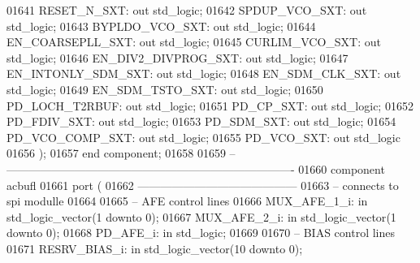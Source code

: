 \begin{DoxyCode}
01641         RESET\_N\_SXT:    \textcolor{keywordflow}{out} \textcolor{comment}{std\_logic};
01642         SPDUP\_VCO\_SXT:  \textcolor{keywordflow}{out} \textcolor{comment}{std\_logic};
01643         BYPLDO\_VCO\_SXT: \textcolor{keywordflow}{out} \textcolor{comment}{std\_logic};
01644         EN\_COARSEPLL\_SXT:   \textcolor{keywordflow}{out} \textcolor{comment}{std\_logic};
01645         CURLIM\_VCO\_SXT: \textcolor{keywordflow}{out} \textcolor{comment}{std\_logic};
01646         EN\_DIV2\_DIVPROG\_SXT:    \textcolor{keywordflow}{out} \textcolor{comment}{std\_logic};
01647         EN\_INTONLY\_SDM\_SXT: \textcolor{keywordflow}{out} \textcolor{comment}{std\_logic};
01648         EN\_SDM\_CLK\_SXT: \textcolor{keywordflow}{out} \textcolor{comment}{std\_logic};
01649         EN\_SDM\_TSTO\_SXT:    \textcolor{keywordflow}{out} \textcolor{comment}{std\_logic};
01650         PD\_LOCH\_T2RBUF: \textcolor{keywordflow}{out} \textcolor{comment}{std\_logic};
01651         PD\_CP\_SXT:      \textcolor{keywordflow}{out} \textcolor{comment}{std\_logic};
01652         PD\_FDIV\_SXT:    \textcolor{keywordflow}{out} \textcolor{comment}{std\_logic};
01653         PD\_SDM\_SXT:     \textcolor{keywordflow}{out} \textcolor{comment}{std\_logic};
01654         PD\_VCO\_COMP\_SXT:    \textcolor{keywordflow}{out} \textcolor{comment}{std\_logic};
01655         PD\_VCO\_SXT:     \textcolor{keywordflow}{out} \textcolor{comment}{std\_logic}
01656     );
01657 \textcolor{keywordflow}{end} \textcolor{keywordflow}{component};
01658 
01659 \textcolor{keyword}{-- ----------------------------------------------------------------------------}
01660 \textcolor{keywordflow}{component} acbufl
01661     \textcolor{keywordflow}{port} (
01662 \textcolor{keyword}{    ------------------------------------------  }
01663 \textcolor{keyword}{    -- connects to spi modulle}
01664 
01665 \textcolor{keyword}{    -- AFE control lines}
01666     MUX\_AFE\_1\_i:    \textcolor{keywordflow}{in} \textcolor{comment}{std\_logic\_vector}(\textcolor{vhdllogic}{}\textcolor{vhdllogic}{1} \textcolor{keywordflow}{downto} \textcolor{vhdllogic}{}\textcolor{vhdllogic}{0});
01667     MUX\_AFE\_2\_i:    \textcolor{keywordflow}{in} \textcolor{comment}{std\_logic\_vector}(\textcolor{vhdllogic}{}\textcolor{vhdllogic}{1} \textcolor{keywordflow}{downto} \textcolor{vhdllogic}{}\textcolor{vhdllogic}{0});
01668     PD\_AFE\_i:   \textcolor{keywordflow}{in} \textcolor{comment}{std\_logic};
01669 
01670 \textcolor{keyword}{    -- BIAS control lines}
01671     RESRV\_BIAS\_i:   \textcolor{keywordflow}{in} \textcolor{comment}{std\_logic\_vector}(\textcolor{vhdllogic}{}\textcolor{vhdllogic}{10} \textcolor{keywordflow}{downto} \textcolor{vhdllogic}{}\textcolor{vhdllogic}{0});

\end{DoxyCode}
